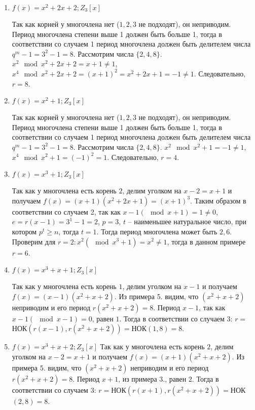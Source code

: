 \documentclass[utf8x, 14pt]{G7-32} %
\begin{document}
\begin{enumerate}
    \item $f(x)=x^2+2x+2; Z_3[x]$
    
    Так как корней у многочлена нет ($1,2,3$ не подходят), он неприводим. Период многочлена степени выше 1 должен быть больше 1, тогда в соответствии со случаем 1 период многочлена должен быть делителем числа $q^m -1 = 3^2 -1 = 8$. Рассмотрим числа $\{2, 4, 8\}$. $x^2 \mod x^2 + 2x +2 = x +1 \neq 1$,  $x^4 \mod x^2 + 2x +2 = (x +1)^2 = x^2 + 2x + 1 = - 1 \neq 1$. Следовательно, $r=8$.

    \item $f(x)=x^2+1; Z_3[x]$
    
    Так как корней у многочлена нет ($1,2,3$ не подходят), он неприводим. Период многочлена степени выше 1 должен быть больше 1, тогда в соответствии со случаем 1 период многочлена должен быть делителем числа $q^m -1 = 3^2 -1 = 8$. Рассмотрим числа $\{2, 4, 8\}$. $x^2 \mod x^2 + 1 = -1 \neq 1$,  $x^4 \mod x^2 + 1 = (-1)^2 = 1$. Следовательно, $r=4$.

    \item $f(x)=x^3+1; Z_3[x]$
    
    Так как у многочлена есть корень $2$, делим уголком на $x-2 = x+1$ и получаем $f(x) = (x+1) (x^2 + 2x +1) = (x+1)^3$. Таким образом в соответствии со случаем 2, так как $x - 1 (\mod{x + 1}) = 1 \neq 0$, $e = r(x-1) = 3^1 - 1 = 2$, $p = 3$, $t$ – наименьшее натуральное число, при котором $p^t\geq n$, тогда $t = 1$. Тогда период многочлена может быть ${2, 6}$. Проверим для $r = 2: x^2 (\mod x^3 + 1) = x^2 \neq 1$, тогда в данном примере $r = 6$.

    \item $f(x)=x^3+x+1; Z_3[x]$
    
    Так как у многочлена есть корень $1$, делим уголком на $x-1$ и получаем $f(x) = (x-1) (x^2 + x +2)$. Из примера 5. видим, что $(x^2 + x +2)$ неприводим и его период $r(x^2 + x +2) = 8$. Период $x -1$, так как $x -1 (\mod{x - 1}) = 0$, равен $1$. Тогда в соответствии со случаем 3: $r =$НОК$(r(x-1), r(x^2 + x +2)) = $НОК$(1, 8) = 8$.
    

    \item $f(x)=x^3+x+2; Z_3[x]$
    Так как у многочлена есть корень $2$, делим уголком на $x-2 = x+1$ и получаем $f(x) = (x+1) (x^2 + x +2)$. Из примера 5. видим, что $(x^2 + x +2)$ неприводим и его период $r(x^2 + x +2) = 8$. Период $x + 1$, из примера 3., равен $2$. Тогда в соответствии со случаем 3: $r =$НОК$(r(x+1), r(x^2 + x +2)) = $НОК$(2, 8) = 8$.
    
\end{enumerate}
\end{document}
